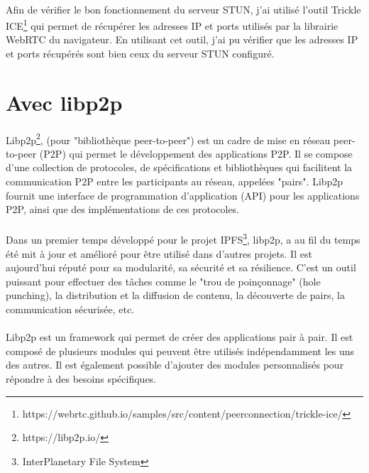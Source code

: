 \paragraph{}
Afin de vérifier le bon fonctionnement du serveur STUN, j'ai utilisé l'outil Trickle ICE\footnote{https://webrtc.github.io/samples/src/content/peerconnection/trickle-ice/} qui permet de récupérer les adresses IP et ports utilisés par la librairie WebRTC du navigateur.
En utilisant cet outil, j'ai pu vérifier que les adresses IP et ports récupérés sont bien ceux du serveur STUN configuré. 


\newpage
\section{Avec libp2p}

\paragraph{}
Libp2p\footnote{https://libp2p.io/}, (pour "bibliothèque peer-to-peer") est un cadre de mise en réseau peer-to-peer (P2P) qui permet le développement des applications P2P. Il se compose d'une collection de protocoles, de spécifications et bibliothèques qui 
facilitent la communication P2P entre les participants au réseau, appelées "pairs". Libp2p fournit une interface de programmation d'application (API) pour les applications P2P, ainsi que des implémentations de ces protocoles.

\paragraph{}
Dans un premier temps développé pour le projet IPFS\footnote{InterPlanetary File System}, libp2p, a au fil du temps été mit à jour et amélioré pour être utilisé dans d'autres projets. Il est aujourd'hui réputé pour sa modularité, sa sécurité et sa résilience. C'est un outil
puissant pour effectuer des tâches comme le "trou de poinçonnage" (hole punching), la distribution et la diffusion de contenu, la découverte de pairs, la communication sécurisée, etc. 

\paragraph{}
Libp2p est un framework qui permet de créer des applications pair à pair. Il est composé de plusieurs modules qui peuvent être utilisés indépendamment les uns des autres. Il est également possible d'ajouter des modules personnalisés
pour répondre à des besoins spécifiques. 


